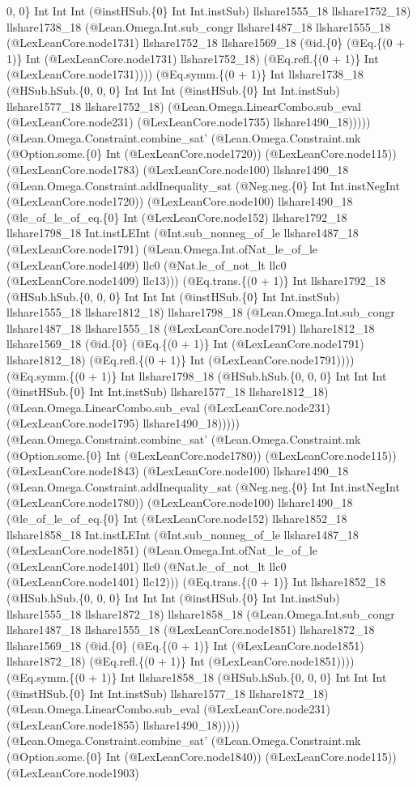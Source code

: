 \documentclass[11pt]{article}
\begin{document}
0, 0\} Int Int Int (@instHSub.\{0\} Int Int.instSub) llshare1555\_18 llshare1752\_18) llshare1738\_18 (@Lean.Omega.Int.sub\_congr llshare1487\_18 llshare1555\_18 (@LexLeanCore.node1731) llshare1752\_18 llshare1569\_18 (@id.\{0\} (@Eq.\{(0 + 1)\} Int (@LexLeanCore.node1731) llshare1752\_18) (@Eq.refl.\{(0 + 1)\} Int (@LexLeanCore.node1731)))) (@Eq.symm.\{(0 + 1)\} Int llshare1738\_18 (@HSub.hSub.\{0, 0, 0\} Int Int Int (@instHSub.\{0\} Int Int.instSub) llshare1577\_18 llshare1752\_18) (@Lean.Omega.LinearCombo.sub\_eval (@LexLeanCore.node231) (@LexLeanCore.node1735) llshare1490\_18))))) (@Lean.Omega.Constraint.combine\_sat' (@Lean.Omega.Constraint.mk (@Option.some.\{0\} Int (@LexLeanCore.node1720)) (@LexLeanCore.node115)) (@LexLeanCore.node1783) (@LexLeanCore.node100) llshare1490\_18 (@Lean.Omega.Constraint.addInequality\_sat (@Neg.neg.\{0\} Int Int.instNegInt (@LexLeanCore.node1720)) (@LexLeanCore.node100) llshare1490\_18 (@le\_of\_le\_of\_eq.\{0\} Int (@LexLeanCore.node152) llshare1792\_18 llshare1798\_18 Int.instLEInt (@Int.sub\_nonneg\_of\_le llshare1487\_18 (@LexLeanCore.node1791) (@Lean.Omega.Int.ofNat\_le\_of\_le (@LexLeanCore.node1409) llc0 (@Nat.le\_of\_not\_lt llc0 (@LexLeanCore.node1409) llc13))) (@Eq.trans.\{(0 + 1)\} Int llshare1792\_18 (@HSub.hSub.\{0, 0, 0\} Int Int Int (@instHSub.\{0\} Int Int.instSub) llshare1555\_18 llshare1812\_18) llshare1798\_18 (@Lean.Omega.Int.sub\_congr llshare1487\_18 llshare1555\_18 (@LexLeanCore.node1791) llshare1812\_18 llshare1569\_18 (@id.\{0\} (@Eq.\{(0 + 1)\} Int (@LexLeanCore.node1791) llshare1812\_18) (@Eq.refl.\{(0 + 1)\} Int (@LexLeanCore.node1791)))) (@Eq.symm.\{(0 + 1)\} Int llshare1798\_18 (@HSub.hSub.\{0, 0, 0\} Int Int Int (@instHSub.\{0\} Int Int.instSub) llshare1577\_18 llshare1812\_18) (@Lean.Omega.LinearCombo.sub\_eval (@LexLeanCore.node231) (@LexLeanCore.node1795) llshare1490\_18))))) (@Lean.Omega.Constraint.combine\_sat' (@Lean.Omega.Constraint.mk (@Option.some.\{0\} Int (@LexLeanCore.node1780)) (@LexLeanCore.node115)) (@LexLeanCore.node1843) (@LexLeanCore.node100) llshare1490\_18 (@Lean.Omega.Constraint.addInequality\_sat (@Neg.neg.\{0\} Int Int.instNegInt (@LexLeanCore.node1780)) (@LexLeanCore.node100) llshare1490\_18 (@le\_of\_le\_of\_eq.\{0\} Int (@LexLeanCore.node152) llshare1852\_18 llshare1858\_18 Int.instLEInt (@Int.sub\_nonneg\_of\_le llshare1487\_18 (@LexLeanCore.node1851) (@Lean.Omega.Int.ofNat\_le\_of\_le (@LexLeanCore.node1401) llc0 (@Nat.le\_of\_not\_lt llc0 (@LexLeanCore.node1401) llc12))) (@Eq.trans.\{(0 + 1)\} Int llshare1852\_18 (@HSub.hSub.\{0, 0, 0\} Int Int Int (@instHSub.\{0\} Int Int.instSub) llshare1555\_18 llshare1872\_18) llshare1858\_18 (@Lean.Omega.Int.sub\_congr llshare1487\_18 llshare1555\_18 (@LexLeanCore.node1851) llshare1872\_18 llshare1569\_18 (@id.\{0\} (@Eq.\{(0 + 1)\} Int (@LexLeanCore.node1851) llshare1872\_18) (@Eq.refl.\{(0 + 1)\} Int (@LexLeanCore.node1851)))) (@Eq.symm.\{(0 + 1)\} Int llshare1858\_18 (@HSub.hSub.\{0, 0, 0\} Int Int Int (@instHSub.\{0\} Int Int.instSub) llshare1577\_18 llshare1872\_18) (@Lean.Omega.LinearCombo.sub\_eval (@LexLeanCore.node231) (@LexLeanCore.node1855) llshare1490\_18))))) (@Lean.Omega.Constraint.combine\_sat' (@Lean.Omega.Constraint.mk (@Option.some.\{0\} Int (@LexLeanCore.node1840)) (@LexLeanCore.node115)) (@LexLeanCore.node1903) 
\end{document}

